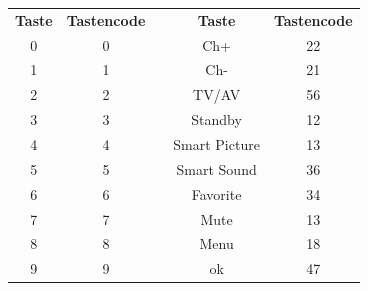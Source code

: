\documentclass[12pt,a4paper,bibliography=totocnumbered,listof=totocnumbered]{scrartcl}
\begin{document}
\begin{table}[h]
	\centering
	
	
	\begin{tabular}{|c|c|c|c|c|}
		\cline{1-2} \cline{4-5}
		\textbf{Taste}                                   & \textbf{Tastencode} & \multicolumn{1}{l|}{} & \textbf{Taste}                        & \textbf{Tastencode} \\ \cline{1-2} \cline{4-5} \noalign{\smallskip} \cline{1-2} \cline{4-5}
		\cellcolor[gray]{.8}0 						 & 0                   &                       & \cellcolor[gray]{.8}Ch+           & 22                  \\ \cline{1-2} \cline{4-5} 
		\cellcolor[gray]{.8}1                        & 1                   &                       & \cellcolor[gray]{.8}Ch-           & 21                  \\ \cline{1-2} \cline{4-5} 
		\cellcolor[gray]{.8}2                        & 2                   &                       & \cellcolor[gray]{.8}TV/AV         & 56                  \\ \cline{1-2} \cline{4-5} 
		\cellcolor[gray]{.8}3                        & 3                   &                       & \cellcolor[gray]{.8}Standby       & 12                  \\ \cline{1-2} \cline{4-5} 
		\cellcolor[gray]{.8}4                        & 4                   &                       & \cellcolor[gray]{.8}Smart Picture & 13                  \\ \cline{1-2} \cline{4-5} 
		\cellcolor[gray]{.8}5                        & 5                   &                       & \cellcolor[gray]{.8}Smart Sound   & 36                  \\ \cline{1-2} \cline{4-5} 
		\cellcolor[gray]{.8}6                        & 6                   &                       & \cellcolor[gray]{.8}Favorite      & 34                  \\ \cline{1-2} \cline{4-5} 
		\cellcolor[gray]{.8}7                        & 7                   &                       & \cellcolor[gray]{.8}Mute          & 13                  \\ \cline{1-2} \cline{4-5} 
		\cellcolor[gray]{.8}8                        & 8                   &                       & \cellcolor[gray]{.8}Menu          & 18                  \\ \cline{1-2} \cline{4-5} 
		\cellcolor[gray]{.8}9                        & 9                   &                       & \cellcolor[gray]{.8}ok            & 47                  \\ \cline{1-2} \cline{4-5} 

\end{tabular}
\end{table}
\end{document}
